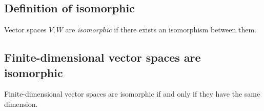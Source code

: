 \documentclass[11pt]{article}
\begin{document}
    \subsection{Definition of isomorphic}
    Vector spaces $V,W$ are \emph{isomorphic} if there exists an isomorphism between them.

    \subsection{Finite-dimensional vector spaces are isomorphic}
    
    Finite-dimensional vector spaces are isomorphic if and only if they have the same dimension. 
\end{document}
